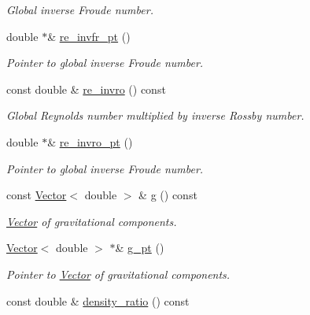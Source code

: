 \begin{DoxyCompactItemize}
\begin{DoxyCompactList}\small\item\em Global inverse Froude number. \end{DoxyCompactList}\item 
double $\ast$\& \hyperlink{classoomph_1_1GeneralisedNewtonianAxisymmetricNavierStokesEquations_a3875ea67858672d174eae2ea96ccefe9}{re\+\_\+invfr\+\_\+pt} ()
\begin{DoxyCompactList}\small\item\em Pointer to global inverse Froude number. \end{DoxyCompactList}\item 
const double \& \hyperlink{classoomph_1_1GeneralisedNewtonianAxisymmetricNavierStokesEquations_a126b1666893257f251499e07ebdf4866}{re\+\_\+invro} () const
\begin{DoxyCompactList}\small\item\em Global Reynolds number multiplied by inverse Rossby number. \end{DoxyCompactList}\item 
double $\ast$\& \hyperlink{classoomph_1_1GeneralisedNewtonianAxisymmetricNavierStokesEquations_adb41642dcc5ddd652f3ad1bf9a05fd07}{re\+\_\+invro\+\_\+pt} ()
\begin{DoxyCompactList}\small\item\em Pointer to global inverse Froude number. \end{DoxyCompactList}\item 
const \hyperlink{classoomph_1_1Vector}{Vector}$<$ double $>$ \& \hyperlink{classoomph_1_1GeneralisedNewtonianAxisymmetricNavierStokesEquations_af13a37d01a345265f81cf8a3453bfef9}{g} () const
\begin{DoxyCompactList}\small\item\em \hyperlink{classoomph_1_1Vector}{Vector} of gravitational components. \end{DoxyCompactList}\item 
\hyperlink{classoomph_1_1Vector}{Vector}$<$ double $>$ $\ast$\& \hyperlink{classoomph_1_1GeneralisedNewtonianAxisymmetricNavierStokesEquations_a955e87edee9243f468540bbc5cc2e87f}{g\+\_\+pt} ()
\begin{DoxyCompactList}\small\item\em Pointer to \hyperlink{classoomph_1_1Vector}{Vector} of gravitational components. \end{DoxyCompactList}\item 
const double \& \hyperlink{classoomph_1_1GeneralisedNewtonianAxisymmetricNavierStokesEquations_acbe06e89e9fc1f6f42b566213a115b83}{density\+\_\+ratio} () const

\end{DoxyCompactItemize}

